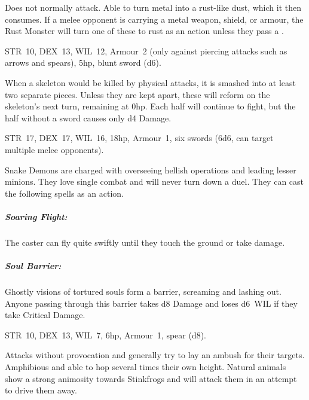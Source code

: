 \documentclass[itdr]{subfiles}
\begin{document}
Does not normally attack. Able to turn metal into a rust-like dust, which it then consumes. If a melee opponent is carrying a metal weapon, shield, or armour, the Rust Monster will turn one of these to rust as an action unless they pass a .

STR~10, DEX~13, WIL~12, Armour~2 (only against piercing attacks such as arrows and spears), 5hp, blunt sword (d6).

When a skeleton would be killed by physical attacks, it is smashed into at least two separate pieces. Unless they are kept apart, these will reform on the skeleton's next turn, remaining at 0hp. Each half will continue to fight, but the half without a sword causes only d4 Damage.


\vfill
\break

\vspace{-1em}

STR~17, DEX~17, WIL~16, 18hp, Armour~1, six swords (6d6, can target multiple melee opponents).

Snake Demons are charged with overseeing hellish operations and leading lesser minions. They love single combat and will never turn down a duel. They can cast the following spells as an action.

\subparagraph{Soaring Flight:} The caster can fly quite swiftly until they touch the ground or take damage.

\subparagraph{Soul Barrier:} Ghostly visions of tortured souls form a barrier, screaming and lashing out. Anyone passing through this barrier takes d8 Damage and loses d6~WIL if they take Critical Damage.


STR~10, DEX~13, WIL~7, 6hp, Armour~1, spear (d8).

Attacks without provocation and generally try to lay an ambush for their targets. Amphibious and able to hop several times their own height. Natural animals show a strong animosity towards Stinkfrogs and will attack them in an attempt to drive them away.
\end{document}
